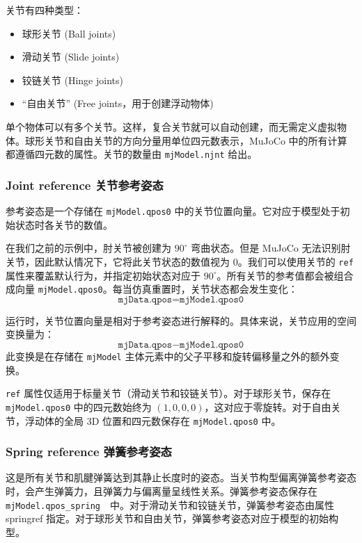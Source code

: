 关节有四种类型：
\begin{itemize}
	\item 球形关节 (Ball joints)
	\item 滑动关节 (Slide joints)
	\item 铰链关节 (Hinge joints)
	\item “自由关节” (Free joints，用于创建浮动物体)
\end{itemize}

单个物体可以有多个关节。这样，复合关节就可以自动创建，而无需定义虚拟物体。球形关节和自由关节的方向分量用单位四元数表示，MuJoCo 中的所有计算都遵循四元数的属性。关节的数量由 \texttt{mjModel.njnt} 给出。

\subsubsection{Joint reference 关节参考姿态}
参考姿态是一个存储在 \texttt{mjModel.qpos0} 中的关节位置向量。它对应于模型处于初始状态时各关节的数值。

在我们之前的示例中，肘关节被创建为 $90^\circ$ 弯曲状态。但是 MuJoCo 无法识别肘关节，因此默认情况下，它将此关节状态的数值视为 $0$。我们可以使用关节的 \texttt{ref} 属性来覆盖默认行为，并指定初始状态对应于 $90^\circ$。所有关节的参考值都会被组合成向量 \texttt{mjModel.qpos0}。每当仿真重置时，关节状态都会发生变化：
\begin{equation*}
	\texttt{mjData.qpos} = \texttt{mjModel.qpos0}
\end{equation*}

运行时，关节位置向量是相对于参考姿态进行解释的。具体来说，关节应用的空间变换量为：
\begin{equation*}
	\texttt{mjData.qpos} - \texttt{mjModel.qpos0}
\end{equation*}
此变换是在存储在 \texttt{mjModel} 主体元素中的父子平移和旋转偏移量之外的额外变换。

\texttt{ref} 属性仅适用于标量关节（滑动关节和铰链关节）。对于球形关节，保存在 \texttt{mjModel.qpos0} 中的四元数始终为 $(1,0,0,0)$，这对应于零旋转。对于自由关节，浮动体的全局 3D 位置和四元数保存在 \texttt{mjModel.qpos0} 中。

\subsubsection{Spring reference 弹簧参考姿态}
这是所有关节和肌腱弹簧达到其静止长度时的姿态。当关节构型偏离弹簧参考姿态时，会产生弹簧力，且弹簧力与偏离量呈线性关系。弹簧参考姿态保存在\texttt{mjModel.qpos\_spring}  中。对于滑动关节和铰链关节，弹簧参考姿态由属性 springref 指定。对于球形关节和自由关节，弹簧参考姿态对应于模型的初始构型。

